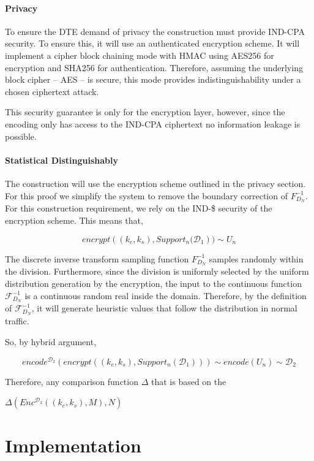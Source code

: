 \documentclass[ %
                    author={Samuel Russell},
                supervisor={Prof. Bogdan Warinschi},
                    degree={MEng},
                     title={Innocuous Ciphertexts},
                  subtitle={The DE-CENSOR Scheme},
                      type={research},
                      year={2018} ]{dissertation}
\begin{document}
\subsubsection{Privacy}

To ensure the DTE demand of privacy the construction must provide IND-CPA security.
To ensure this, it will use an authenticated encryption scheme.
It will implement a cipher block chaining mode with HMAC using AES256 for encryption and SHA256 for authentication.
Therefore, assuming the underlying block cipher -- AES -- is secure, this mode provides indistinguishability under a chosen ciphertext attack.

This security guarantee is only for the encryption layer, however, since the encoding only has access to the IND-CPA ciphertext no information leakage is possible.

\subsubsection{Statistical Distinguishably}


The construction will use the encryption scheme outlined in the privacy section.
For this proof we simplify the system to remove the boundary correction of $F^{-1}_{D_N}$.
For this construction requirement, we rely on the IND-\$ security of the encryption scheme.
This means that, 

$$ encrypt \left( (k_e, k_s), Support_n(\mathcal{D}_1 \right) ) \sim  U_n$$ 

The discrete inverse transform sampling function $F^{-1}_{D_N}$ samples randomly within the division.
Furthermore, since the division is uniformly selected by the uniform distribution generation by the encryption, the input to the continuous function $\mathcal{F}^{-1}_{D_N}$ is a continuous random real inside the domain.
Therefore, by the definition of $\mathcal{F}^{-1}_{D_N}$, it will generate heuristic values that follow the distribution in normal traffic.

So, by hybrid argument,

$$ encode^{\mathcal{D}_2} \left( encrypt \left( (k_e, k_s), Support_n(\mathcal{D}_1) \right) \right) \sim  encode \left( U_n \right) \sim \mathcal{D}_2$$

Therefore, any comparison function $\Delta$ that is based on the 

$\Delta \left(  Enc^{\mathcal{D}_2}((k_e,k_s), M), N  \right)$

\chapter{Implementation}
\end{document}
